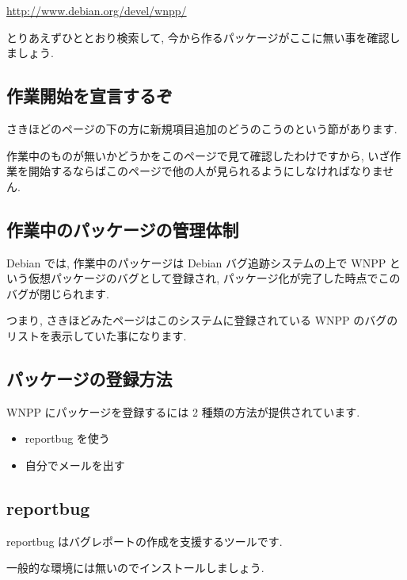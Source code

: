\documentclass[mingoth,a4paper]{jsarticle}
\begin{document}
\begin{commandline}
\begin{center}
\url{http://www.debian.org/devel/wnpp/}
\end{center}

とりあえずひととおり検索して,
今から作るパッケージがここに無い事を確認しましょう.

\subsection{作業開始を宣言するぞ}

さきほどのページの下の方に新規項目追加のどうのこうのという節があります.

作業中のものが無いかどうかをこのページで見て確認したわけですから,
いざ作業を開始するならばこのページで他の人が見られるようにしなければなりません.

\subsection{作業中のパッケージの管理体制}

Debian では, 作業中のパッケージは Debian バグ追跡システムの上で
WNPP という仮想パッケージのバグとして登録され,
パッケージ化が完了した時点でこのバグが閉じられます.

つまり, さきほどみたページはこのシステムに登録されている
WNPP のバグのリストを表示していた事になります.

\subsection{パッケージの登録方法}

WNPP にパッケージを登録するには 2 種類の方法が提供されています.

\begin{itemize}
 \item reportbug を使う
 \item 自分でメールを出す
\end{itemize}

\subsection{reportbug}

reportbug はバグレポートの作成を支援するツールです.

一般的な環境には無いのでインストールしましょう.



\end{commandline}
\end{document}
